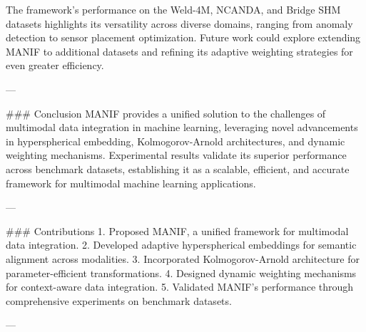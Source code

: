 The framework's performance on the Weld-4M, NCANDA, and Bridge SHM datasets highlights its versatility across diverse domains, ranging from anomaly detection to sensor placement optimization. Future work could explore extending MANIF to additional datasets and refining its adaptive weighting strategies for even greater efficiency.

---

### Conclusion
MANIF provides a unified solution to the challenges of multimodal data integration in machine learning, leveraging novel advancements in hyperspherical embedding, Kolmogorov-Arnold architectures, and dynamic weighting mechanisms. Experimental results validate its superior performance across benchmark datasets, establishing it as a scalable, efficient, and accurate framework for multimodal machine learning applications.

---

### Contributions
1. Proposed MANIF, a unified framework for multimodal data integration.
2. Developed adaptive hyperspherical embeddings for semantic alignment across modalities.
3. Incorporated Kolmogorov-Arnold architecture for parameter-efficient transformations.
4. Designed dynamic weighting mechanisms for context-aware data integration.
5. Validated MANIF's performance through comprehensive experiments on benchmark datasets.

---

